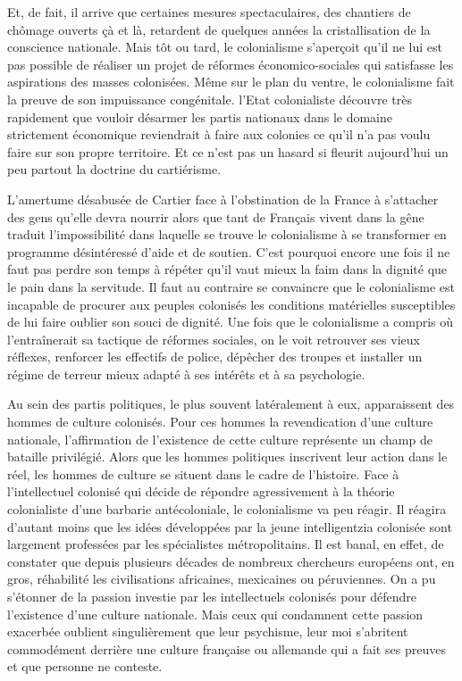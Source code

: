 \documentclass[french,twoside]{book} %
\begin{document}
\bigbreak
\noindent Et, de fait, il arrive que certaines mesures spectaculaires, des chantiers de chômage ouverts çà et là, retardent de quelques années la cristallisation de la conscience nationale. Mais tôt ou tard, le colonialisme s’aperçoit qu’il ne lui est pas possible de   réaliser un projet de réformes économico-sociales qui satisfasse les aspirations des masses colonisées. Même sur le plan du ventre, le colonialisme fait la preuve de son impuissance congénitale. l’Etat colonialiste découvre très rapidement que vouloir désarmer les partis nationaux dans le domaine strictement économique reviendrait à faire aux colonies ce qu’il n’a pas voulu faire sur son propre territoire. Et ce n’est pas un hasard si fleurit aujourd’hui un peu partout la doctrine du cartiérisme.\par
\bigbreak
\noindent L’amertume désabusée de Cartier face à l’obstination de la France à s’attacher des gens qu’elle devra nourrir alors que tant de Français vivent dans la gêne traduit l’impossibilité dans laquelle se trouve le colonialisme à se transformer en programme désintéressé d’aide et de soutien. C’est pourquoi encore une fois il ne faut pas perdre son temps à répéter qu’il vaut mieux la faim dans la dignité que le pain dans la servitude. Il faut au contraire se convaincre que le colonialisme est incapable de procurer aux peuples colonisés les conditions matérielles susceptibles de lui faire oublier son souci de dignité. Une fois que le colonialisme a compris où l’entraînerait sa tactique de réformes sociales, on le voit retrouver ses vieux réflexes, renforcer les effectifs de police, dépêcher des troupes et installer un régime de terreur mieux adapté à ses intérêts et à sa psychologie.\par
Au sein des partis politiques, le plus souvent latéralement à eux, apparaissent des hommes de culture colonisés. Pour ces hommes la revendication d’une culture nationale, l’affirmation de l’existence de cette culture représente un champ de bataille privilégié. Alors que les hommes politiques inscrivent leur action dans le réel, les hommes de culture se situent dans le cadre de l’histoire. Face à l’intellectuel colonisé qui décide de répondre agressivement à la théorie colonialiste d’une barbarie antécoloniale, le colonialisme va peu réagir. Il réagira d’autant moins que les idées développées par la jeune intelligentzia colonisée sont largement professées par les spécialistes métropolitains. Il est banal, en effet, de constater que depuis plusieurs   décades de nombreux chercheurs européens ont, en gros, réhabilité les civilisations africaines, mexicaines ou péruviennes. On a pu s’étonner de la passion investie par les intellectuels colonisés pour défendre l’existence d’une culture nationale. Mais ceux qui condamnent cette passion exacerbée oublient singulièrement que leur psychisme, leur moi s’abritent commodément derrière une culture française ou allemande qui a fait ses preuves et que personne ne conteste.\par
\end{document}
